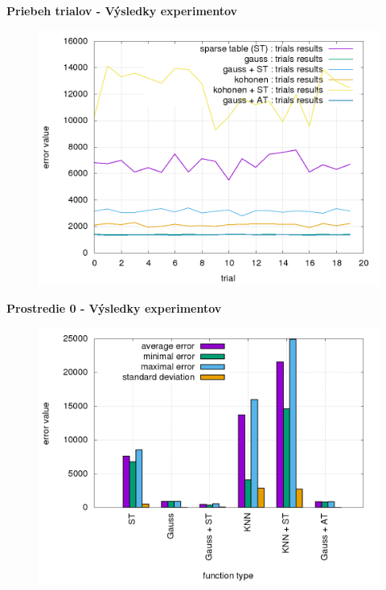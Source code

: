 \documentclass[xcolor=dvipsnames]{beamer}
\begin{document}
\begin{frame}{\bf Priebeh trialov - Výsledky experimentov}

\begin{figure}[!htb]
\centering
\includegraphics[scale=.36]{../../results_q_learning/map_2/trials_average_results_progress.png}
\end{figure}

\end{frame}



\begin{frame}{\bf Prostredie 0 - Výsledky experimentov}

\begin{figure}[!htb]
\centering
\includegraphics[scale=.36]{../../results_q_learning/map_0/trials_average_results.png}
\end{figure}

\end{frame}
\end{document}

